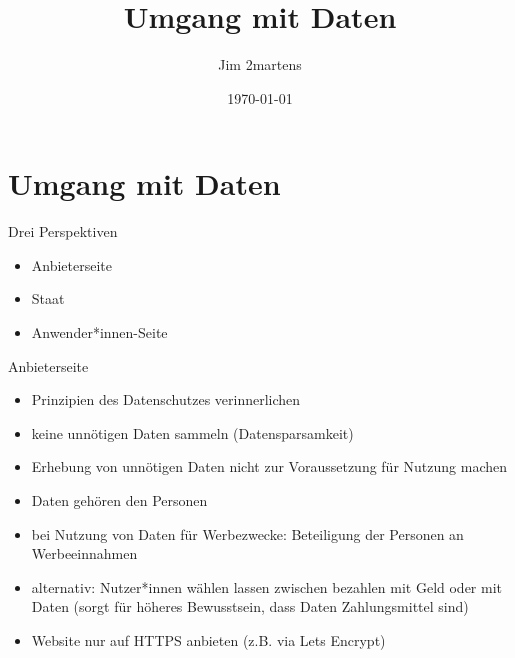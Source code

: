 \documentclass{beamer}
\begin{document}
\author{Jim 2martens}
\title{Umgang mit Daten}
\date{\today}

\begin{frame}
    \titlepage
\end{frame}

\begin{frame}
    \tableofcontents
\end{frame}

\section{Umgang mit Daten}
\begin{frame}{Drei Perspektiven}
    \begin{itemize}
        \item Anbieterseite
        \vfill
        \item Staat
        \vfill
        \item Anwender*innen-Seite
    \end{itemize}
\end{frame}

\begin{frame}{Anbieterseite}
    \begin{itemize}
        \item Prinzipien des Datenschutzes verinnerlichen
        \vfill
        \item keine unnötigen Daten sammeln (Datensparsamkeit)
        \vfill
        \item Erhebung von unnötigen Daten nicht zur Voraussetzung für Nutzung
              machen
        \vfill
        \item Daten gehören den Personen
        \vfill
        \item bei Nutzung von Daten für Werbezwecke: Beteiligung der Personen
              an Werbeeinnahmen
        \vfill
        \item alternativ: Nutzer*innen wählen lassen zwischen bezahlen mit Geld
              oder mit Daten (sorgt für höheres Bewusstsein, dass Daten
              Zahlungsmittel sind)
        \vfill
        \item Website nur auf HTTPS anbieten (z.B. via Lets Encrypt)
    \end{itemize}
\end{frame}
\end{document}
